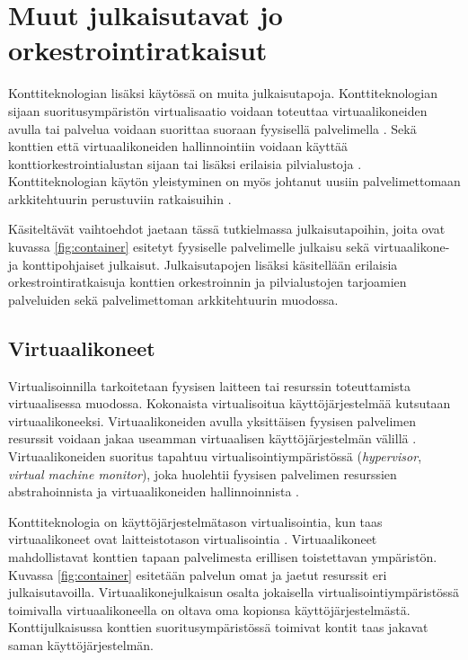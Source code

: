 \chapter{Muut julkaisutavat jo orkestrointiratkaisut\label{options}}

Konttiteknologian lisäksi käytössä on muita julkaisutapoja.
Konttiteknologian sijaan suoritusympäristön virtualisaatio voidaan toteuttaa virtuaalikoneiden avulla tai palvelua voidaan suorittaa suoraan fyysisellä palvelimella \cite{Watada19}.
Sekä konttien että virtuaalikoneiden hallinnointiin voidaan käyttää konttiorkestrointialustan sijaan tai lisäksi erilaisia pilvialustoja \cite{Bousselmi14}.
Konttiteknologian käytön yleistyminen on myös johtanut uusiin palvelimettomaan arkkitehtuurin perustuviin ratkaisuihin \cite{Baldini17}.

Käsiteltävät vaihtoehdot jaetaan tässä tutkielmassa julkaisutapoihin, joita ovat kuvassa \ref{fig:container} esitetyt fyysiselle palvelimelle julkaisu sekä virtuaalikone- ja konttipohjaiset julkaisut.
Julkaisutapojen lisäksi käsitellään erilaisia orkestrointiratkaisuja konttien orkestroinnin ja pilvialustojen tarjoamien palveluiden sekä palvelimettoman arkkitehtuurin muodossa.

\section{Virtuaalikoneet}

Virtualisoinnilla tarkoitetaan fyysisen laitteen tai resurssin toteuttamista virtuaalisessa muodossa.
Kokonaista virtualisoitua käyttöjärjestelmää kutsutaan virtuaalikoneeksi.
Virtuaalikoneiden avulla yksittäisen fyysisen palvelimen resurssit voidaan jakaa useamman virtuaalisen käyttöjärjestelmän välillä \cite{Smith05}.
Virtuaalikoneiden suoritus tapahtuu virtualisointiympäristössä (\textit{hypervisor}, \textit{virtual machine monitor}), joka huolehtii fyysisen palvelimen resurssien abstrahoinnista ja virtuaalikoneiden hallinnoinnista \cite{desai13}.

Konttiteknologia on käyttöjärjestelmätason virtualisointia, kun taas virtuaalikoneet ovat laitteistotason virtualisointia \cite{Compastie20}.
Virtuaalikoneet mahdollistavat konttien tapaan palvelimesta erillisen toistettavan ympäristön.
Kuvassa \ref{fig:container} esitetään palvelun omat ja jaetut resurssit eri julkaisutavoilla.
Virtuaalikonejulkaisun osalta jokaisella virtualisointiympäristössä toimivalla virtuaalikoneella on oltava oma kopionsa käyttöjärjestelmästä.
Konttijulkaisussa konttien suoritusympäristössä toimivat kontit taas jakavat saman käyttöjärjestelmän.

